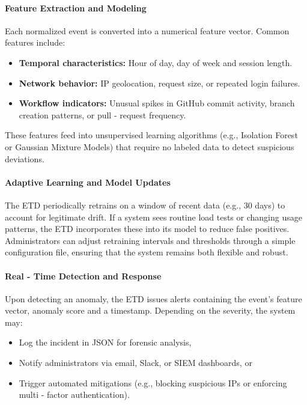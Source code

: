 \documentclass{article}
\begin{document}
\paragraph{Feature Extraction and Modeling}
Each normalized event is converted into a numerical feature vector. Common features include:
\begin{itemize}
    \item \textbf{Temporal characteristics:} Hour of day, day of week and session length.
    \item \textbf{Network behavior:} IP geolocation, request size, or repeated login failures.
    \item \textbf{Workflow indicators:} Unusual spikes in GitHub commit activity, branch creation patterns, or pull - request frequency.
\end{itemize}
These features feed into unsupervised learning algorithms (e.g., Isolation Forest or Gaussian Mixture Models) that require no labeled data to detect suspicious deviations.

\paragraph{Adaptive Learning and Model Updates}
The ETD periodically retrains on a window of recent data (e.g., 30 days) to account for legitimate drift. If a system sees routine load tests or changing usage patterns, the ETD incorporates these into its model to reduce false positives. Administrators can adjust retraining intervals and thresholds through a simple configuration file, ensuring that the system remains both flexible and robust.

\paragraph{Real - Time Detection and Response}
Upon detecting an anomaly, the ETD issues alerts containing the event’s feature vector, anomaly score and a timestamp. Depending on the severity, the system may:
\begin{itemize}
    \item Log the incident in JSON for forensic analysis,
    \item Notify administrators via email, Slack, or SIEM dashboards, or
    \item Trigger automated mitigations (e.g., blocking suspicious IPs or enforcing multi - factor authentication).
\end{itemize}
\end{document}
